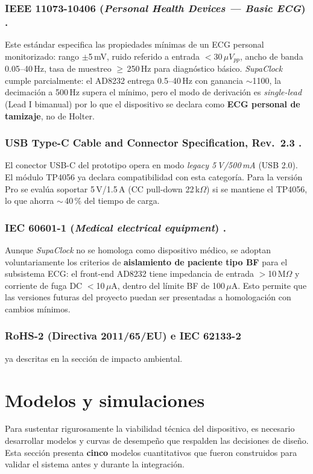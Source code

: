 \documentclass[letterpaper,11pt]{article}
\begin{document}
\subsubsection{IEEE 11073-10406 (\textit{Personal Health Devices --- Basic ECG}) \cite{ieee11073}.}
Este estándar especifica las propiedades mínimas de un ECG personal monitorizado: rango
$\pm$5\,mV, ruido referido a entrada $<$30\,$\mu V_{pp}$, ancho de banda 0.05--40\,Hz, tasa
de muestreo $\geq$\,250\,Hz para diagnóstico básico. \textit{SupaClock} cumple parcialmente:
el AD8232 entrega 0.5--40\,Hz con ganancia $\sim$1100, la decimación a 500\,Hz supera el
mínimo, pero el modo de derivación es \textit{single-lead} (Lead I bimanual) por lo que el
dispositivo se declara como \textbf{ECG personal de tamizaje}, no de Holter.

\subsubsection{USB Type-C Cable and Connector Specification, Rev.~2.3 \cite{usbpd}.}
El conector USB-C del prototipo opera en modo \textit{legacy 5\,V/500\,mA} (USB 2.0). El
módulo TP4056 ya declara compatibilidad con esta categoría. Para la versión Pro se evalúa
soportar 5\,V/1.5\,A (CC pull-down 22\,k$\Omega$) si se mantiene el TP4056, lo que ahorra
$\sim$\,40\,\% del tiempo de carga.

\subsubsection{IEC 60601-1 (\textit{Medical electrical equipment}) \cite{iec60601}.}
Aunque \textit{SupaClock} no se homologa como dispositivo médico, se adoptan voluntariamente
los criterios de \textbf{aislamiento de paciente tipo BF} para el subsistema ECG: el
front-end AD8232 tiene impedancia de entrada $>$10\,M$\Omega$ y corriente de fuga DC
$<$10\,$\mu$A, dentro del límite BF de 100\,$\mu$A. Esto permite que las versiones futuras
del proyecto puedan ser presentadas a homologación con cambios mínimos.

\subsubsection{RoHS-2 (Directiva 2011/65/EU) \cite{rohs} e IEC 62133-2 \cite{en62133}}
ya descritas en la sección de impacto ambiental.

\section{Modelos y simulaciones}
\label{sec:modelos}
Para sustentar rigurosamente la viabilidad técnica del dispositivo, es necesario desarrollar
modelos y curvas de desempeño que respalden las decisiones de diseño. Esta sección presenta
\textbf{cinco} modelos cuantitativos que fueron construidos para validar el sistema
antes y durante la integración.
\end{document}
